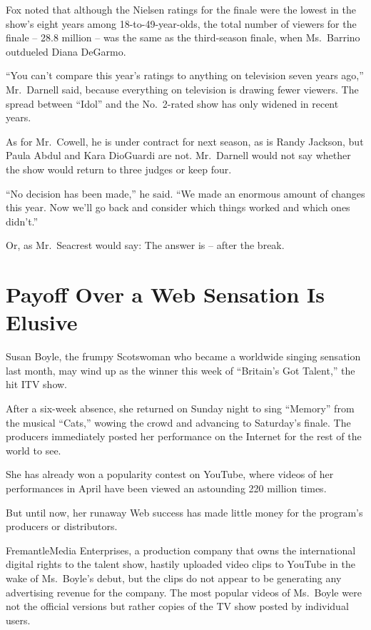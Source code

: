\documentclass[12pt,a4paper,onecolumn]{article}
\begin{document}
Fox noted that although the Nielsen ratings for the finale were the lowest in the show's eight years
among 18-to-49-year-olds, the total number of viewers for the finale -- 28.8 million -- was the same
as the third-season finale, when Ms.~Barrino outdueled Diana DeGarmo.

``You can't compare this year's ratings to anything on television seven years ago,'' Mr.~Darnell
said, because everything on television is drawing fewer viewers. The spread between ``Idol'' and the
No.~2-rated show has only widened in recent years.

As for Mr.~Cowell, he is under contract for next season, as is Randy Jackson, but Paula Abdul and
Kara DioGuardi are not. Mr.~Darnell would not say whether the show would return to three judges or
keep four.

``No decision has been made,'' he said. ``We made an enormous amount of changes this year. Now we'll
go back and consider which things worked and which ones didn't.''

Or, as Mr.~Seacrest would say: The answer is -- after the break.

\section{Payoff Over a Web Sensation Is Elusive}

Susan Boyle, the frumpy Scotswoman who became a worldwide singing sensation last month, may wind up
as the winner this week of ``Britain's Got Talent,'' the hit ITV show.

After a six-week absence, she returned on Sunday night to sing ``Memory'' from the musical ``Cats,''
wowing the crowd and advancing to Saturday's finale. The producers immediately posted her
performance on the Internet for the rest of the world to see.

She has already won a popularity contest on YouTube, where videos of her performances in April have
been viewed an astounding 220 million times.

But until now, her runaway Web success has made little money for the program's producers or
distributors.

FremantleMedia Enterprises, a production company that owns the international digital rights to the
talent show, hastily uploaded video clips to YouTube in the wake of Ms.~Boyle's debut, but the clips
do not appear to be generating any advertising revenue for the company. The most popular videos of
Ms.~Boyle were not the official versions but rather copies of the TV show posted by individual
users.
\end{document}
